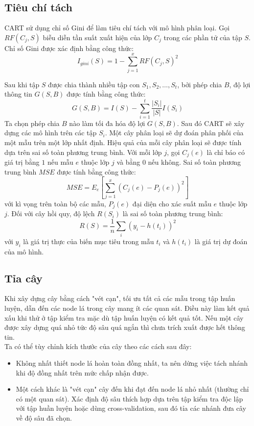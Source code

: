 \subsection{Tiêu chí tách}
CART sử dụng chỉ số Gini để làm tiêu chí tách với mô hình phân loại. Gọi $RF(C_j,S)$ biễu diễn tần suất xuất hiện của lớp $C_j$ trong các phần tử của tập $S$. Chỉ số Gini được xác định bằng công thức:
$$I_{gini}(S)=1- \sum^x_{j=1}RF(C_j,S)^2$$

Sau khi tập $S$ được chia thành nhiều tập con $S_1,S_2,\ldots,S_t$, bởi phép chia $B$, độ lợi thông tin $G(S,B)$ được tính bằng công thức:
$$G(S,B) = I(S) - \sum^t_{i=1}\frac{|S_i|}{|S|}I(S_i)$$
Ta chọn phép chia $B$ nào làm tối đa hóa độ lợi $G(S,B)$.
Sau đó CART sẽ xây dựng các mô hình trên các tập $S_i$. Một cây phân loại sẽ dự đoán phân phối của một mẫu trên một lớp nhất định. Hiệu quả của mỗi cây phân loại sẽ được tính dựa trên sai số toàn phương trung bình. Với mỗi lớp $j$, gọi $C_j(e)$ là chỉ báo có giá trị bằng $1$ nếu mẫu $e$ thuộc lớp $j$ và bằng $0$ nếu không. Sai số toàn phương trung bình $MSE$ được tính bằng công thức:
$$MSE=E_e\left[\sum^x_{j=1}(C_j(e)-P_j(e))^2\right]$$
với kì vọng trên toàn bộ các mẫu, $P_j(e)$ đại diện cho xác suất mẫu $e$ thuộc lớp $j$. Đối với cây hồi quy, độ lệch  $R(S_i)$ là sai số toàn phương trung bình:
$$R(S) = \frac{1}{n}\sum_i(y_i - h(t_i))^2$$
với $y_i$ là giá trị thực của biến mục tiêu trong mẫu $t_i$ và $h(t_i)$ là giá trị dự đoán của mô hình.\\


\subsection{Tỉa cây}
Khi xây dựng cây bằng cách "vét cạn", tối ưu tất cả các mẫu trong tập huấn luyện, dẫn đến các node lá trong cây mang ít các quan sát. Điều này làm kết quả xấu khi thử ở tập kiểm tra mặc dù tập huấn luyện có kết quả tốt. Nếu một cây được xây dựng quá nhỏ tức độ sâu quá ngắn thì chưa trích xuất được hết thông tin.\\
Ta có thể tùy chỉnh kích thước của cây theo các cách sau đây:
\begin{itemize}
\item Không nhất thiết node lá hoàn toàn đồng nhất, ta nên dừng việc tách nhánh khi độ đồng nhất trên mức chấp nhận được.
\item Một cách khác là "vét cạn" cây đến khi đạt đến node lá nhỏ nhất (thường chỉ có một quan sát). Xác định độ sâu thích hợp dựa trên tập kiểm tra độc lập với tập huần luyện  hoặc dùng cross-validation, sau đó tỉa các nhánh đưa cây về độ sâu đã chọn.
\end{itemize}

